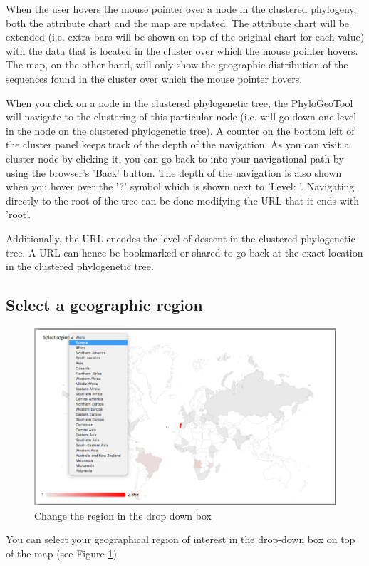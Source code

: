 \documentclass[a4paper, 11pt]{article} %
\begin{document}
When the user hovers the mouse pointer over a node in the clustered phylogeny, both the attribute chart and the map are updated. 
The attribute chart will be extended (i.e. extra bars will be shown on top of the original chart for each value) with the data that is located in the cluster over which the mouse pointer hovers.
The map, on the other hand, will only show the geographic distribution of the sequences found in the cluster over which the mouse pointer hovers.

When you click on a node in the clustered phylogenetic tree, the PhyloGeoTool will navigate to the clustering of this particular node (i.e. will go down one level in the node on the clustered phylogenetic tree).
A counter on the bottom left of the cluster panel keeps track of the depth of the navigation. 
As you can visit a cluster node by clicking it, you can go back to into your navigational path by using the browser's 'Back' button.
The depth of the navigation is also shown when you hover over the '?' symbol which is shown next to 'Level: '. 
Navigating directly to the root of the tree can be done modifying the URL that it ends with 'root'. 

Additionally, the URL encodes the level of descent in the clustered phylogenetic tree. 
A URL can hence be bookmarked or shared to go back at the exact location in the clustered phylogenetic tree. 


\subsection{Select a geographic region}
\begin{figure}[H]
\centering
\includegraphics[scale=0.38]{images/change_country.PNG}
\vspace{-0.75cm}
\caption{Change the region in the drop down box}
\label{fig:change_region}
\end{figure}
You can select your geographical region of interest in the drop-down box on top of the map (see Figure \ref{fig:change_region}). 
\end{document}
